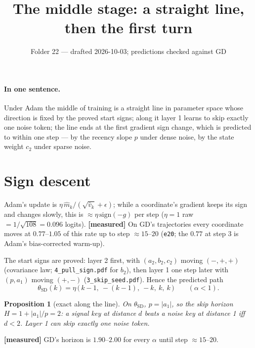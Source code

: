 \documentclass[11pt]{article}
\title{The middle stage: a straight line, then the first turn}
\author{Folder 22 --- drafted 2026-10-03; predictions checked against GD}
\date{}
\newtheorem{proposition}{Proposition}
\theoremstyle{remark}\newtheorem{remark}{Remark}
\begin{document}
\maketitle

\paragraph{In one sentence.} Under Adam the middle of training is a straight line in parameter
space whose direction is fixed by the proved start signs; along it layer 1 learns to skip exactly
one noise token; the line ends at the first gradient sign change, which is predicted to within one
step --- by the recency slope $p$ under dense noise, by the state weight $c_2$ under sparse noise.

\section{Sign descent}
Adam's update is $\eta\,\hat m_k/(\sqrt{\hat v_k}+\epsilon)$; while a coordinate's gradient keeps its sign
and changes slowly, this is $\approx\eta\,\mathrm{sign}(-g)$ per step ($\eta=1$ raw $=1/\sqrt{108}=0.096$
logits). \textbf{[measured]} On GD's trajectories every coordinate moves at $0.77$--$1.05$ of this rate
up to step $\approx15$--$20$ (\texttt{e20}; the $0.77$ at step 3 is Adam's bias-corrected warm-up).

The start signs are proved: layer 2 first, with $(a_2,b_2,c_2)$ moving $(-,+,+)$ (covariance law;
\texttt{4\_pull\_sign.pdf} for $b_2$), then layer 1 one step later with $(p,a_1)$ moving $(+,-)$
(\texttt{3\_skip\_seed.pdf}). Hence the predicted path
\[
\theta_{\mathrm{SD}}(k)=\eta\,\big(\,k-1,\ -(k-1),\ -k,\ k,\ k\,\big)\qquad(\alpha<1).
\]

\begin{proposition}[exact along the line]
On $\theta_{\mathrm{SD}}$, $p=|a_1|$, so the skip horizon $H=1+|a_1|/p=2$: a signal key at distance
$d$ beats a noise key at distance 1 iff $d<2$. Layer 1 can skip exactly one noise token.
\end{proposition}
\textbf{[measured]} GD's horizon is $1.90$--$2.00$ for every $\alpha$ until step $\approx15$--$20$.
\end{document}
